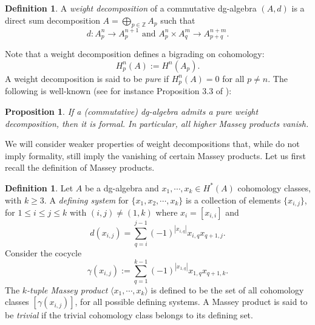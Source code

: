 \documentclass[a4paper]{amsart}
\newtheorem{prop}[theo]{Proposition}
\theoremstyle{definition}
\newtheorem{defi}[theo]{Definition}
\newcommand{\ZZ}{\mathbb{Z}}
\begin{document}
\begin{defi}
 A \textit{weight decomposition} of a commutative dg-algebra $(A,d)$ is a direct sum decomposition $A=\bigoplus_{p\in\ZZ} A_p$ such that 
 \[d:A_p^n\to A_p^{n+1}\text{ and }A^n_p\times A^m_q\to A^{n+m}_{p+q}.\]
\end{defi}
Note that a weight decomposition defines a bigrading on cohomology:
\[H^n_p(A):=H^n(A_p).\]
 A weight decomposition is said to be \textit{pure} if $H^n_p(A)=0$ for all $p\neq n$. 
The following is well-known (see for instance Proposition 3.3 of \cite{Thom}):
\begin{prop}\label{formalpure}
 If a (commutative) dg-algebra admits a pure weight decomposition, then it is formal. In particular, all higher Massey products vanish.
\end{prop}
We will consider weaker properties of weight decompositions that, while do not imply formality, still imply the vanishing of certain Massey products.
Let us first recall the definition of Massey products.

\begin{defi}
Let $A$ be a dg-algebra and $x_1,\cdots,x_k\in H^*(A)$ cohomology classes, with $k\geq 3$. A \textit{defining system} for $\{x_1,x_2,\cdots,x_k\}$ is a collection of elements $\{x_{i,j}\}$, for $1\leq i\leq j\leq k$ with $(i,j)\neq (1,k)$
where $x_i=[x_{i,i}]$ and 
\[d(x_{i,j})=\sum_{q=i}^{j-1} (-1)^{|x_{i,q}|} x_{i,q} x_{q+1,j}.\]
Consider the cocycle 
\[\gamma(x_{i,j}):=\sum_{q=1}^{k-1}(-1)^{|x_{1,q}|} x_{1,q} x_{q+1,k}.\]
The \textit{$k$-tuple Massey product} $\langle x_1,\cdots,x_k\rangle$ is defined to be the set of all cohomology classes
$[\gamma(x_{i,j})]$, for all possible defining systems. 
A Massey product is said to be \textit{trivial} if the trivial cohomology class belongs to its defining set.
\end{defi}
\end{document}
